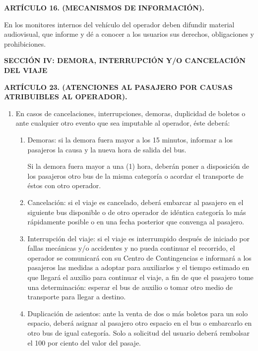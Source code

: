 	\textbf{ARTÍCULO 16. (MECANISMOS DE INFORMACIÓN).}
	
	En los monitores internos del vehículo del operador deben difundir material audiovisual, que informe y dé a conocer a los usuarios sus derechos, obligaciones y prohibiciones.
	
	\textbf{SECCIÓN IV: DEMORA, INTERRUPCIÓN Y/O CANCELACIÓN DEL VIAJE}
	
	\textbf{ARTÍCULO 23. (ATENCIONES AL PASAJERO POR CAUSAS ATRIBUIBLES AL OPERADOR).}
	
	\begin{enumerate}[label=\Roman*.,
		nosep, %
		itemsep=0pt, %
		parsep=0pt %
		]
		\item En casos de cancelaciones, interrupciones, demoras, duplicidad de boletos o ante cualquier otro evento que sea imputable al operador, éste deberá:
		\begin{enumerate}[label=\alph*),
			nosep, %
			itemsep=0pt, %
			parsep=0pt %
			]
			\item Demoras: si la demora fuera mayor a los 15 minutos, informar a los pasajeros la causa y la nueva hora de salida del bus.
			
			Si la demora fuera mayor a una (1) hora, deberán poner a disposición de los pasajeros otro bus de la misma categoría o acordar el transporte de éstos con otro operador.
			
			\item Cancelación: si el viaje es cancelado, deberá embarcar al pasajero en el siguiente bus disponible o de otro operador de idéntica categoría lo más rápidamente posible o en una fecha posterior que convenga al pasajero.
			
			\item Interrupción del viaje: si el viaje es interrumpido después de iniciado por fallas mecánicas y/o accidentes y no pueda continuar el recorrido, el operador se comunicará con su Centro de Contingencias e informará a los pasajeros las medidas a adoptar para auxiliarlos y el tiempo estimado en que llegará el auxilio para continuar el viaje, a fin de que el pasajero tome una determinación: esperar el bus de auxilio o tomar otro medio de transporte para llegar a destino.
			
			\item Duplicación de asientos: ante la venta de dos o más boletos para un solo espacio, deberá asignar al pasajero otro espacio en el bus o embarcarlo en otro bus de igual categoría. Solo a solicitud del usuario deberá rembolsar el 100 por ciento del valor del pasaje.
			

\end{enumerate}
\end{enumerate}
